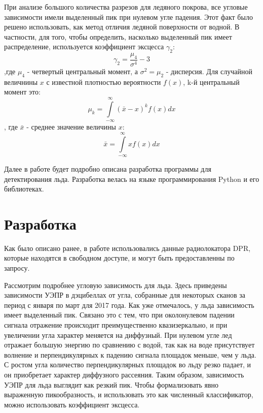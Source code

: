 При анализе большого количества разрезов для ледяного покрова, все  угловые зависимости имели выделенный пик при нулевом
угле падения. Этот факт было решено использовать, как метод отличия ледяной поверхности от водной. В частности, для
того, чтобы определить, насколько выделенный пик имеет распределение, используется коэффициент эксцесса $\gamma_2$:
\begin{equation}
  \gamma_2 = \frac{\mu_4}{\sigma^4} -3
  \label{eq:5}
\end{equation}
,где $\mu_4$ - четвертый центральный момент, а $\sigma^2 = \mu_2$ - дисперсия. Для случайной величнины $x$ с известной плотностью вероятности $f(x)$, k-й
центральный момент это:
\begin{equation}
  \mu_k = \int \limits_{-\infty}^{\infty}(\bar{x}-x)^k f(x) dx
  \label{eq:6}
\end{equation} 
, где $\bar{x}$ - среднее значение величины $x$:
\begin{equation}
  \bar{x} = \int \limits_{-\infty}^{\infty}x f(x) dx
  \label{eq:7}
\end{equation}

Далее в работе будет подробно описана разработка программы для детектирования льда. Разработка
велась на языке программирования Python и его библиотеках.

\section{Разработка}

Как было описано ранее, в работе использовались данные радиолокатора DPR, которые находятся в свободном доступе, и могут
быть предоставленны по запросу.




Рассмотрим подробнее угловую зависимость для льда.  
Здесь приведены зависимости УЭПР в дэцибеллах от угла, собранные для некоторых сканов за период с января по март для 2017 года.
Как уже отмечалось, у льда зависимость имеет выделенный пик. Связано это с тем, что при околонулевом падении сигнала
отражение происходит преимущественно квазизеркально, и при увеличении угла характер меняется на диффузный. При нулевом
угле лед отражает большую энергию по сравнению с водой, так как на воде присутствует волнение и перпендикулярных к
падению сигнала площадок меньше, чем у льда. С ростом угла количество перпендикулярных площадок во льду резко падает, и
он приобретает характер диффузного рассеяния. Таким образом, зависимость УЭПР для льда выглядит как резкий пик. Чтобы
формализовать явно выраженную пикообразность, и использовать это как численный классификатор, можно использовать
коэффициент эксцесса.


